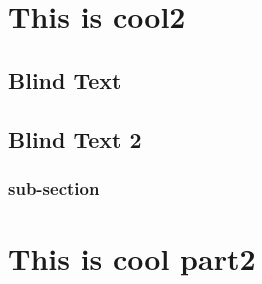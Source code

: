 \documentclass[12pt, a4paper, openany]{book}
\newcommand\blankpage{%
    \null
    \thispagestyle{empty}%
    \addtocounter{page}{-1}%
    \newpage}
\begin{document}
\listoftables
\clearpage
\afterpage{\blankpage}



\chapter{This is cool2}
\section{Blind Text}
\blindtext[6]

\section{Blind Text 2}
\blindtext[3]
\subsection{sub-section}
\blindtext[4]

\chapter{This is cool part2}
\blindtext[1]



\end{document}
